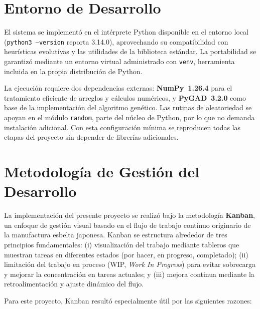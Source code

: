 \section{Entorno de Desarrollo}

El sistema se implementó en el intérprete Python disponible en el entorno local (\texttt{python3 --version} reporta 3.14.0), aprovechando su compatibilidad con heurísticas evolutivas y las utilidades de la biblioteca estándar. La portabilidad se garantizó mediante un entorno virtual administrado con \texttt{venv}, herramienta incluida en la propia distribución de Python.

La ejecución requiere dos dependencias externas: \textbf{NumPy~1.26.4} para el tratamiento eficiente de arreglos y cálculos numéricos, y \textbf{PyGAD~3.2.0} como base de la implementación del algoritmo genético. Las rutinas de aleatoriedad se apoyan en el módulo \texttt{random}, parte del núcleo de Python, por lo que no demanda instalación adicional. Con esta configuración mínima se reproducen todas las etapas del proyecto sin depender de librerías adicionales.

\section{Metodología de Gestión del Desarrollo}

La implementación del presente proyecto se realizó bajo la metodología \textbf{Kanban}, un enfoque de gestión visual basado en el flujo de trabajo continuo originario de la manufactura esbelta japonesa. Kanban se estructura alrededor de tres principios fundamentales: (i) visualización del trabajo mediante tableros que muestran tareas en diferentes estados (por hacer, en progreso, completado); (ii) limitación del trabajo en proceso (WIP, \textit{Work In Progress}) para evitar sobrecarga y mejorar la concentración en tareas actuales; y (iii) mejora continua mediante la retroalimentación y ajuste dinámico del flujo.

Para este proyecto, Kanban resultó especialmente útil por las siguientes razones:

